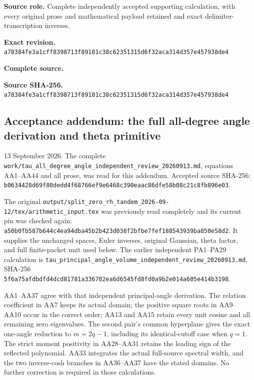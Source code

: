 \documentclass{article}
\begin{document}
\maketitle
\begingroup
\sloppy
\small

\noindent\textbf{Source role.} Complete independently accepted supporting calculation, with every original prose and mathematical payload retained and exact delimiter-transcription inverses.\par
\noindent\textbf{Exact revision.} \nolinkurl{a78384fe3a1cff8398713f89181c38c62351315d6f32aca314d357e457938de4}\par
\noindent\textbf{Complete source.} \par
\noindent\textbf{Source SHA-256.} \nolinkurl{a78384fe3a1cff8398713f89181c38c62351315d6f32aca314d357e457938de4}\par\medskip
\subsection{Acceptance addendum: the full all-degree angle derivation and theta primitive}\label{endpoint-angle_primitive_acceptance--acceptance-addendum-the-full-all-degree-angle-derivation-and-theta-primitive}

13 September 2026. The complete \nolinkurl{work/tau_all_degree_angle_independent_review_20260913.md}, equations AA1--AA44 and all prose, was read for this addendum. Accepted source SHA-256: \nolinkurl{b0634428d69f80dedd4f68766ef9e6468c390eaac86dfe58b08c21c8fb896e03}.

The original \nolinkurl{output/split_zero_rh_tandem_2026-09-12/tex/arithmetic_input.tex} was previously read completely and its current pin was checked again: \nolinkurl{a50b0fb587b644c4ea94dba45b2b423d038f2bfbe7fef188543939ba850e58d2}. It supplies the unchanged spaces, Euler inverses, original Gaussian, theta factor, and full finite-packet unit used below. The earlier independent PA1--PA29 calculation is \nolinkurl{tau_principal_angle_volume_independent_review_20260913.md}, SHA-256 \nolinkurl{5f6a75afdbdfd4dcd81781a336702ea6d6545fd8fd0a9b2e014a605e414b3198}.

AA1--AA37 agree with that independent principal-angle derivation. The relation coefficient in AA7 keeps its actual domain; the positive square roots in AA9--AA10 occur in the correct order; AA13 and AA15 retain every unit cosine and all remaining zero eigenvalues. The second pair's common hyperplane gives the exact one-angle reduction to \(m=2q-1\), including its identical-cutoff case when \(q=1\). The strict moment positivity in AA28--AA31 retains the leading sign of the reflected polynomial. AA33 integrates the actual full-source spectral width, and the two inverse-cosh branches in AA36--AA37 have the stated domains. No further correction is required in those calculations.
\end{document}
